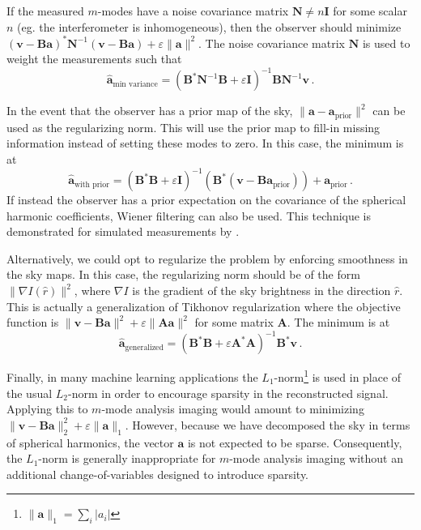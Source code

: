 \documentclass[twocolumn]{aastex61}
\renewcommand{\b}{\pmb}
\begin{document}
If the measured $m$-modes have a noise covariance matrix $\b N \neq n\b I$ for some scalar $n$ (eg.
the interferometer is inhomogeneous), then the observer should minimize $(\b v-\b B\b a)^*\b
N^{-1}(\b v-\b B\b a) + \varepsilon\|\b a\|^2$. The noise covariance matrix $\b N$ is used to weight
the measurements such that
\begin{equation}
    \b{\hat a}_\text{min variance} = (\b B^*\b N^{-1}\b B + \varepsilon\b I)^{-1}
        \b B\b N^{-1}\b v\,.
\end{equation}

In the event that the observer has a prior map of the sky, $\|\b a - \b a_\text{prior}\|^2$ can be
used as the regularizing norm. This will use the prior map to fill-in missing information instead of
setting these modes to zero. In this case, the minimum is at
\begin{equation}
    \b{\hat a}_\text{with prior} = (\b B^*\b B + \varepsilon\b I)^{-1}
        (\b B^*(\b v - \b B\b a_\text{prior}))
        + \b a_\text{prior}\,.
\end{equation}
If instead the observer has a prior expectation on the covariance of the spherical harmonic
coefficients, Wiener filtering can also be used.  This technique is demonstrated for simulated
measurements by \citet{2016arXiv161203255B}.

Alternatively, we could opt to regularize the problem by enforcing smoothness in the sky maps. In
this case, the regularizing norm should be of the form $\|\nabla I(\hat r)\|^2$, where $\nabla I$ is
the gradient of the sky brightness in the direction $\hat r$. This is actually a generalization of
Tikhonov regularization where the objective function is $\|\b v-\b B\b a\|^2 + \varepsilon\|\b A\b
a\|^2$ for some matrix $\b A$. The minimum is at
\begin{equation}
    \b{\hat a}_\text{generalized} = (\b B^*\b B + \varepsilon\b A^*\b A)^{-1}\b B^*\b v\,.
\end{equation}

Finally, in many machine learning applications the $L_1$-norm\footnote{
    $\|\b a\|_1 = \sum_i |a_i|$
} is used in place of the usual $L_2$-norm in order to encourage sparsity in the reconstructed
signal. Applying this to $m$-mode analysis imaging would amount to minimizing $\|\b v-\b B\b a\|_2^2
+ \varepsilon\|\b a\|_1$. However, because we have decomposed the sky in terms of spherical
harmonics, the vector $\b a$ is not expected to be sparse. Consequently, the $L_1$-norm is generally
inappropriate for $m$-mode analysis imaging without an additional change-of-variables designed to
introduce sparsity.
\end{document}
